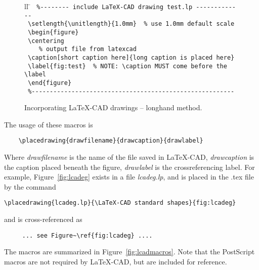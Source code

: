 \documentclass[a4paper]{article}
\begin{document}
\begin{figure}
    \centering
    \begin{tabbing}{ll}
        \hspace{3mm} \= \kill
         \verb! %-------- include LaTeX-CAD drawing test.lp ------------- ! \\
         \verb! \setlength{\unitlength}{1.0mm}  % use 1.0mm default scale ! \\
         \verb! \begin{figure} ! \\
            \> \verb! \centering !  \\
            \> \verb!    % output file from latexcad ! \\
            \> \verb! \caption[short caption here]{long caption is placed here} ! \\
            \> \verb! \label{fig:test}  % NOTE: \caption MUST come before the \label ! \\
         \verb! \end{figure} !   \\
         \verb! %-------------------------------------------------------- ! \\
    \end{tabbing}
    \caption{Incorporating LaTeX-CAD drawings -- longhand method.}
    \label{fig:longhand}
\end{figure}

The usage of these macros is
\begin{verbatim}
    \placedrawing{drawfilename}{drawcaption}{drawlabel}
\end{verbatim}

Where \textit{drawfilename} is the name of the file saved in LaTeX-CAD,
\textit{drawcaption} is the caption placed beneath the figure,
\textit{drawlabel} is the crossreferencing label. For example,
Figure~\ref{fig:lcadeg} exists in a file \textit{lcadeg.lp}, and is
placed in the .tex file by the command
\begin{verbatim}
\placedrawing{lcadeg.lp}{\LaTeX-CAD standard shapes}{fig:lcadeg}
\end{verbatim}
and is cross-referenced as
\begin{verbatim}
     ... see Figure~\ref{fig:lcadeg} ....
\end{verbatim}

The macros are summarized in Figure~\ref{fig:lcadmacros}. Note that
the PostScript macros are not required by LaTeX-CAD, but are included
for reference.
\end{document}
